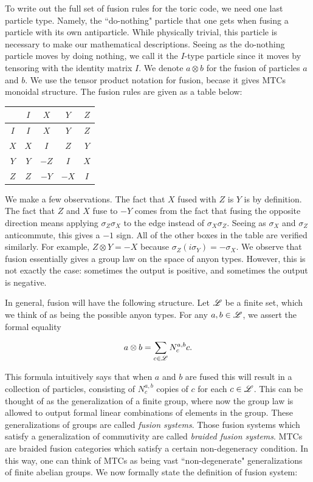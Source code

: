 \documentclass{article}
\theoremstyle{definition}
\numberwithin{figure}{section}
\begin{document}
To write out the full set of fusion rules for the toric code, we need one last particle type. Namely, the ``do-nothing" particle that one gets when fusing a particle with its own antiparticle. While physically trivial, this particle is necessary to make our mathematical descriptions. Seeing as the do-nothing particle moves by doing nothing, we call it the $I$-type particle since it moves by tensoring with the identity matrix $I$. We denote $a\otimes b$ for the fusion of particles $a$ and $b$. We use the tensor product notation for fusion, becase it gives MTCs monoidal structure. The fusion rules are given as a table below:

\begin{center}
\begin{tabular}{c |c |c |c |c} 
 & $I$ & $X$ & $Y$ & $Z$ \\ [0.5ex] 
 \hline
 $I$ & $I$ & $X$ & $Y$ & $Z$ \\ 
 \hline
 $X$ & $X$ & $I$ & $Z$ & $Y$ \\
 \hline
 $Y$ & $Y$ & $-Z$ & $I$ & $X$ \\
 \hline
 $Z$ & $Z$ & $-Y$ & $-X$ & $I$
\end{tabular}
\end{center}

We make a few observations. The fact that $X$ fused with $Z$ is $Y$ is by definition. The fact that $Z$ and $X$ fuse to $-Y$ comes from the fact that fusing the opposite direction means applying $\sigma_Z\sigma_X$ to the edge instead of $\sigma_X\sigma_Z$. Seeing as $\sigma_X$ and $\sigma_Z$ anticommute, this gives a $-1$ sign. All of the other boxes in the table are verified similarly. For example, $Z\otimes Y=-X$ because $\sigma_Z(i\sigma_Y)=-\sigma_X$. We observe that fusion essentially gives a group law on the space of anyon types. However, this is not exactly the case: sometimes the output is positive, and sometimes the output is negative.

In general, fusion will have the following structure. Let $\mathscr{L}$ be a finite set, which we think of as being the possible anyon types. For any $a,b\in \mathscr{L}$, we assert the formal equality

$$a\otimes b=\sum_{c\in \mathscr{L}}N_{c}^{a,b}c.$$

This formula intuitively says that when $a$ and $b$ are fused this will result in a collection of particles, consisting of $N_c^{a,b}$ copies of $c$ for each $c\in \mathscr{L}$. This can be thought of as the generalization of a finite group, where now the group law is allowed to output formal linear combinations of elements in the group. These generalizations of groups are called \textit{fusion systems}. Those fusion systems which satisfy a generalization of commutivity are called \textit{braided fusion systems}. MTCs are braided fusion categories which satisfy a certain non-degeneracy condition. In this way, one can think of MTCs as being vast ``non-degenerate" generalizations of finite abelian groups. We now formally state the definition of fusion system:
\end{document}
